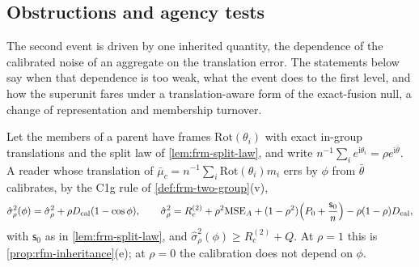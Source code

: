 \subsection{Obstructions and agency tests}\label{sec:rfm-obstructions}

The second event is driven by one inherited quantity, the dependence of the calibrated noise of an aggregate on the translation error. The statements below say when that dependence is too weak, what the event does to the first level, and how the superunit fares under a translation-aware form of the exact-fusion null, a change of representation and membership turnover.

\begin{lemma}\label{lem:rfm-coherence}
Let the members of a parent have frames $\mathrm{Rot}(\theta_i)$ with exact in-group translations and the split law of \cref{lem:frm-split-law}, and write $n^{-1}\sum_{i}e^{\mathrm i\theta_i}=\rho e^{\mathrm i\bar\theta}$. A reader whose translation of $\bar\mu_c=n^{-1}\sum_i\mathrm{Rot}(\theta_i)m_i$ errs by $\phi$ from $\bar\theta$ calibrates, by the C1g rule of \cref{def:frm-two-group}(v),
\begin{equation}\label{eq:rfm-coherence}
\hat\sigma_\rho^2(\phi)=\hat\sigma_\rho^2+\rho D_{\mathrm{cal}}(1-\cos\phi),\qquad\hat\sigma_\rho^2=R_c^{(2)}+\rho^2\mathrm{MSE}_A+(1-\rho^2)\Bigl(P_0+\frac{\mathsf s_0}n\Bigr)-\rho(1-\rho)D_{\mathrm{cal}},
\end{equation}
with $\mathsf s_0$ as in \cref{lem:frm-split-law}, and $\hat\sigma^2_\rho(\phi)\ge R_c^{(2)}+Q$. At $\rho=1$ this is \cref{prop:rfm-inheritance}(e); at $\rho=0$ the calibration does not depend on $\phi$.
\end{lemma}

